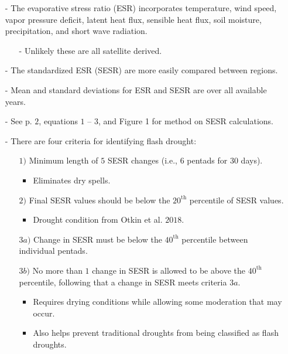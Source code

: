 \documentclass[12pt, letterpaper]{article}
\begin{document}
    \begin{itemize}
    	\item[-] The evaporative stress ratio (ESR) incorporates temperature, wind speed, vapor pressure
    	         deficit, latent heat flux, sensible heat flux, soil moisture, precipitation, and short
    	         wave radiation.
    	\begin{itemize}
    		\item[-] Unlikely these are all satellite derived.
    	\end{itemize}
    	\item[-] The standardized ESR (SESR) are more easily compared between regions.
    	\item[-] Mean and standard deviations for ESR and SESR are over all available years.
    	\item[-] See p. $2$, equations $1$ -- $3$, and Figure 1 for method on SESR calculations.
    	\item[-] There are four criteria for identifying flash drought:
    	\begin{itemize}
    		\item[$1)$] Minimum length of $5$ SESR changes (i.e., $6$ pentads for $30$ days).
    		\begin{itemize}
    			\item Eliminates dry spells.
    		\end{itemize}
    	    \item [$2)$] Final SESR values should be below the $20^{\text{th}}$ percentile of SESR values.
    	    \begin{itemize}
    	    	\item Drought condition from Otkin et al. $2018$.
    	    \end{itemize}
            \item[$3a)$] Change in SESR must be below the $40^{\text{th}}$ percentile between individual
                         pentads.
            \item[$3b)$] No more than $1$ change in SESR is allowed to be above the $40^{\text{th}}$
                         percentile, following that a change in SESR meets criteria $3a$.
            \begin{itemize}
            	\item Requires drying conditions while allowing some moderation that may occur.
            	\item Also helps prevent traditional droughts from being classified as flash droughts.
            \end{itemize}

\end{itemize}
\end{itemize}
\end{document}
